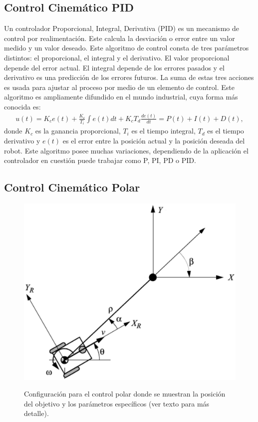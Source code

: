 \subsection{Control Cinemático PID}

Un controlador Proporcional, Integral, Derivativa (PID) es un mecanismo de control 
por realimentación. Este calcula la desviación o error entre un valor medido y 
un valor deseado. Este algoritmo de control consta de tres parámetros distintos: el 
proporcional, el integral y el derivativo. El valor proporcional depende del error 
actual. El integral depende de los errores pasados y el derivativo es una predicción 
de los errores futuros. La suma de estas tres acciones es usada para ajustar al 
proceso por medio de un elemento de control. Este algoritmo es ampliamente 
difundido en el mundo industrial, cuya forma más conocida es:
\begin{align*}
u(t) = K_c e(t) + \frac{K_c}{T_i} \int e(t)dt + K_c T_d \frac{de(t)}{dt} = P(t) + I(t) + D(t),
\end{align*}
donde $K_c$ es la ganancia proporcional, $T_i$ es el tiempo integral, $T_d$ es 
el tiempo derivativo y $e(t)$ es el error entre la posición actual y la posición 
deseada del robot. Este algoritmo posee muchas variaciones, dependiendo de la 
aplicación el controlador en cuestión puede trabajar como P, PI, PD o PID.

\subsection{Control Cinem\'atico Polar}
\label{sec:ControlPolar}
\begin{figure}%
\centering \footnotesize
 {\includegraphics[width=0.70\linewidth]{images/control_polar.eps}}
 \captionsetup{font=footnotesize}
 \caption[Configuración para el control polar donde se muestran la posición del 
 objetivo y los parámetros específicos(ver texto para
 más detalle).]{Configuración para el control polar donde se muestran la posición del 
 objetivo y los parámetros específicos \cite{siegwart2011introduction} (ver texto para
 más detalle).}
\label{f:controlPolar}
\end{figure}

